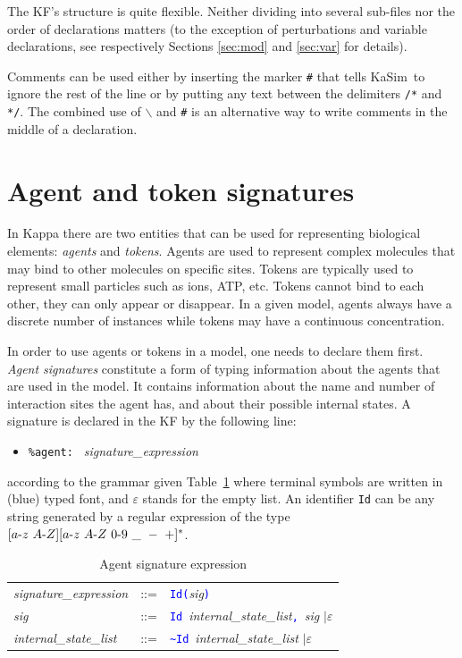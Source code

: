 \documentclass[11pt]{book}
\def\KaSim{\textsf{KaSim}}
\def\sep{\hbox{-}}
\def\intstate{\textasciitilde}
\def\tcb#1{\textcolor{blue}{\ttt{#1}}}
\def\ttt#1{\texttt{#1}}
\def\bs{\backslash}
\def\ITE#1{\begin{itemize}#1\end{itemize}}
\def\imp#1{\emph{#1}\index{#1}}
\begin{document}
The KF's structure is quite flexible. Neither
dividing into several sub-files nor the order of
declarations matters (to the exception of
perturbations and variable declarations, see
respectively Sections \ref{sec:mod} and \ref{sec:var} for details).

Comments can be used either by inserting the marker
\ttt{\#} that tells \KaSim~to ignore the rest of the line or by
putting any text between the delimiters \ttt{/*} and \ttt{*/}. The
combined use of \ttt{$\bs$} and \ttt{\#} is an alternative way to
write comments in the middle of a declaration.

\section{Agent and token signatures}\label{sec:sig}
%
In Kappa there are two entities that can be used for representing
biological elements: \imp{agents} and \imp{tokens}.  Agents are used
to represent complex molecules that may bind to other molecules on
specific sites. Tokens are typically used to represent small particles
such as ions, ATP, etc. Tokens cannot bind to each other, they can
only appear or disappear. In a given model, agents always have a
discrete number of instances while tokens may have a continuous
concentration.

In order to use agents or tokens in a model, one needs to declare them
first. \emph{Agent signatures} constitute a
form of typing information about the agents that are used in the
model. It contains information about the name and number of
interaction sites the agent has, and about their possible internal
states. A signature is declared in the
KF by the following line: \ITE{
\item[] \ttt{\%agent: } \textit{signature\_expression} } according to
the grammar given Table~\ref{tab:sig} where terminal symbols are
written in (blue) typed font, and $\varepsilon$ stands for the empty
list. An identifier \ttt{Id} can be any string generated by a regular
expression of the type $[a\sep z\ A\sep Z][a\sep z\ A \sep Z\ 0\sep
  9\ \_ \ -\ +]^*$.
\begin{table}[htbp]
  \centering
  \caption{Agent signature%
 expression}
  \begin{tabular}{@{} lcl @{}}
    \textit{signature\_expression} & ::= &
    \tcb{Id}\tcb{(}\textit{sig}\tcb{)} \\

    \textit{sig} & ::= &
    \tcb{Id}~\textit{internal\_state\_list}\tcb{,}\ \textit{sig}
    $\mid\varepsilon$ \\

    \textit{internal\_state\_list} & ::= &
    \tcb{\intstate{}Id}~\textit{internal\_state\_list}
    $\mid\varepsilon$
    \end{tabular}
  \label{tab:sig}
\end{table}
\end{document}
